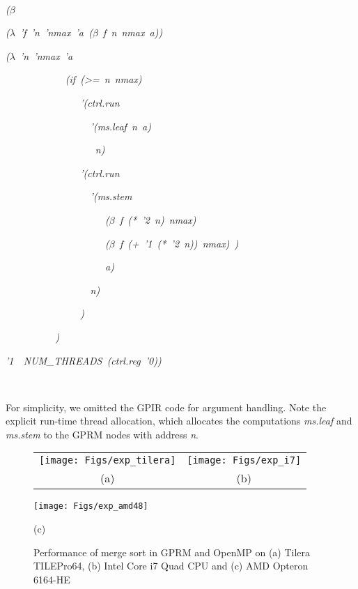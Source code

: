 \documentclass[copyright,creativecommons]{eptcs}
\providecommand{\tabularnewline}{\\}
\newenvironment{lyxcode}
{\par\begin{list}{}{
\setlength{\rightmargin}{\leftmargin}
\setlength{\listparindent}{0pt}\raggedright
\setlength{\itemsep}{0pt}
\setlength{\parsep}{0pt}
\normalfont\ttfamily}\item[]}
{\end{list}}
\begin{document}
~
\begin{lyxcode}
\textrm{\textit{($\beta$~}}

\textrm{\textit{	($\lambda$~'f~'n~'nmax~'a~($\beta$~f~n~nmax~a))~}}

\textrm{\textit{	($\lambda$~'n~'nmax~'a~~~~~~~~~~~~~}}

\textrm{\textit{~~~~~~~~~~~~(if~(>=~n~nmax)}}

\textrm{\textit{~~~~~~~~~~~~~~~'(ctrl.run~}}

\textrm{\textit{~~~~~~~~~~~~~~~~~'(ms.leaf~n~a)~~}}

\textrm{\textit{~~~~~~~~~~~~~~~~~~n)}}

\textrm{\textit{~~~~~~~~~~~~~~~'(ctrl.run~}}

\textrm{\textit{~~~~~~~~~~~~~~~~~'(ms.stem~}}

\textrm{\textit{~~~~~~~~~~~~~~~~~~~~($\beta$~f~({*}~'2~n)~nmax)}}

\textrm{\textit{~~~~~~~~~~~~~~~~~~~~($\beta$~f~(+~'1~({*}~'2~n))~nmax)~)~}}

\textrm{\textit{~~~~~~~~~~~~~~~~~~~~a)}}

\textrm{\textit{~~~~~~~~~~~~~~~~~n)}}~~~~~~~~~

\textrm{\textit{~~~~~~~~~~~~~~~)}}

\textrm{\textit{~~~~~~~~~~)}}

\textrm{\textit{'1~~NUM\_THREADS~(ctrl.reg~'0))}}

~
\end{lyxcode}
For simplicity, we omitted the GPIR code for argument handling. Note
the explicit run-time thread allocation, which allocates the computations
\emph{ms.leaf} and \emph{ms.stem} to the GPRM nodes with address \emph{n}. 

\begin{figure}[h]
\begin{centering}
{\footnotesize }\begin{tabular}{cc}
\texttt{[image: Figs/exp\_tilera]} & \texttt{[image: Figs/exp\_i7]}\tabularnewline
{\footnotesize (a)} & {\footnotesize (b)}\tabularnewline
\end{tabular}
\par\end{centering}{\footnotesize \par}

\noindent \begin{centering}
\texttt{[image: Figs/exp\_amd48]}
\par\end{centering}

\begin{centering}
{\footnotesize (c)}
\par\end{centering}{\footnotesize \par}

\caption{\label{fig:Performance-of-merge-1-1}Performance of merge sort in
GPRM and OpenMP on (a) Tilera TILEPro64, (b) Intel Core i7 Quad CPU
and (c) AMD Opteron 6164-HE}
\end{figure}
\end{document}
